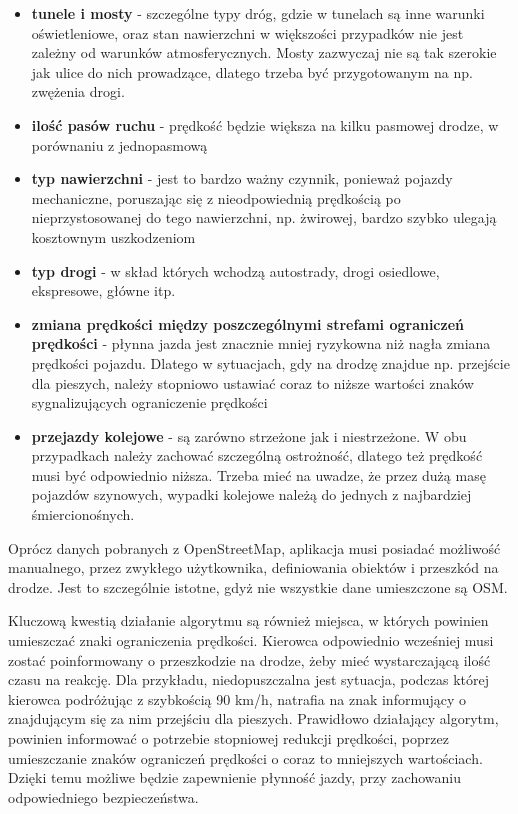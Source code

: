 \begin{itemize}
\item \textbf{tunele i mosty} - szczególne typy dróg, gdzie w tunelach są inne warunki oświetleniowe, oraz stan nawierzchni w większości przypadków nie jest zależny od warunków atmosferycznych. Mosty zazwyczaj nie są tak szerokie jak ulice do nich prowadzące, dlatego trzeba być przygotowanym na np. zwężenia drogi.
\item \textbf{ilość pasów ruchu} - prędkość będzie większa na kilku pasmowej drodze, w porównaniu z jednopasmową
\item \textbf{typ nawierzchni} - jest to bardzo ważny czynnik, ponieważ pojazdy mechaniczne, poruszając się z nieodpowiednią prędkością po nieprzystosowanej do tego nawierzchni, np. żwirowej, bardzo szybko ulegają kosztownym uszkodzeniom
\item \textbf{typ drogi} - w skład których wchodzą autostrady, drogi osiedlowe, ekspresowe, główne itp.
\item \textbf{zmiana prędkości między poszczególnymi strefami ograniczeń prędkości} - płynna jazda jest znacznie mniej ryzykowna niż nagła zmiana prędkości pojazdu. Dlatego w sytuacjach, gdy na drodzę znajdue np. przejście dla pieszych, należy stopniowo ustawiać coraz to niższe wartości znaków sygnalizujących ograniczenie prędkości
\item \textbf{przejazdy kolejowe} - są zarówno strzeżone jak i niestrzeżone. W obu przypadkach należy zachować szczególną ostrożność, dlatego też prędkość musi być odpowiednio niższa. Trzeba mieć na uwadze, że przez dużą masę pojazdów szynowych, wypadki kolejowe należą do jednych z najbardziej śmiercionośnych.
\end{itemize}

Oprócz danych pobranych z OpenStreetMap, aplikacja musi posiadać możliwość manualnego, przez zwykłego użytkownika, definiowania obiektów i przeszkód na drodze. Jest to szczególnie istotne, gdyż nie wszystkie dane umieszczone są OSM.


Kluczową kwestią działanie algorytmu są również miejsca, w których powinien umieszczać znaki ograniczenia prędkości. Kierowca odpowiednio wcześniej musi zostać poinformowany o przeszkodzie na drodze, żeby mieć wystarczającą ilość czasu na reakcję. Dla przykładu, niedopuszczalna jest sytuacja, podczas której kierowca podróżując z szybkością 90 km/h, natrafia na znak informujący o znajdującym się za nim przejściu dla pieszych. Prawidłowo działający algorytm, powinien informować o potrzebie stopniowej redukcji prędkości, poprzez umieszczanie znaków ograniczeń prędkości o coraz to mniejszych wartościach. Dzięki temu możliwe będzie zapewnienie płynność jazdy, przy zachowaniu odpowiedniego bezpieczeństwa.


